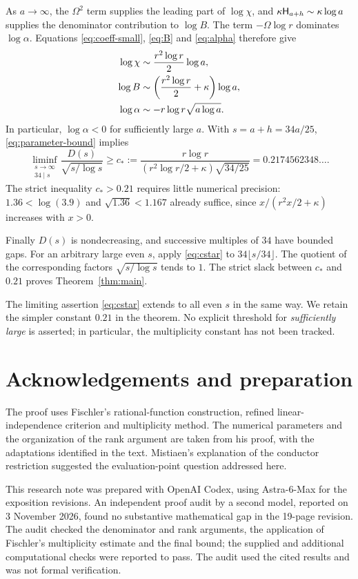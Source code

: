 As $a\to\infty$, the $\Omega^2$ term supplies the leading part of
$\log\chi$, and $\kappa\mathsf H_{a+h}\sim\kappa\log a$ supplies the
denominator contribution to $\log B$. The term $-\Omega\log r$
dominates $\log\alpha$. Equations \eqref{eq:coeff-small}, \eqref{eq:B}
and \eqref{eq:alpha} therefore give
\begin{align}
 \log\chi&\sim\frac{r^2\log r}{2}\log a,\notag\\
 \log B&\sim\left(\frac{r^2\log r}{2}+\kappa\right)\log a,
                                                   \label{eq:rates-asymptotic}\\
 \log\alpha&\sim-r\log r\sqrt{a\log a}.\notag
\end{align}
In particular, $\log\alpha<0$ for sufficiently large $a$.
With $s=a+h=34a/25$, \eqref{eq:parameter-bound} implies
\begin{equation}\label{eq:cstar}
 \liminf_{\substack{s\to\infty\\34\mid s}}
   \frac{D(s)}{\sqrt{s/\log s}}
 \geq
 c_*:=\frac{r\log r}
   {\left(r^2\log r/2+\kappa\right)\sqrt{34/25}}
 =0.2174562348\ldots .
\end{equation}
The strict inequality $c_*>0.21$ requires little numerical precision:
$1.36<\log(3.9)$ and $\sqrt{1.36}<1.167$ already suffice,
since $x/(r^2x/2+\kappa)$ increases with $x>0$.

Finally $D(s)$ is nondecreasing, and successive multiples of $34$ have
bounded gaps. For an arbitrary large even $s$, apply
\eqref{eq:cstar} to $34\lfloor s/34\rfloor$.
The quotient of the corresponding factors $\sqrt{s/\log s}$ tends to $1$.
The strict slack between $c_*$ and $0.21$ proves
Theorem~\ref{thm:main}.

\begin{remark}
The limiting assertion \eqref{eq:cstar} extends to all even $s$ in the
same way. We retain the simpler constant $0.21$ in the theorem.
No explicit threshold for \emph{sufficiently large} is asserted;
in particular, the multiplicity constant has not been tracked.
\end{remark}

\section*{Acknowledgements and preparation}

The proof uses Fischler's rational-function construction, refined
linear-independence criterion and multiplicity method. The numerical
parameters and the organization of the rank argument are taken from his
proof, with the adaptations identified in the text.
Mistiaen's explanation of the conductor restriction suggested the
evaluation-point question addressed here.

This research note was prepared with OpenAI Codex, using Astra-6-Max for
the exposition revisions. An independent proof audit by a second model,
reported on 3 November 2026, found no substantive mathematical gap in the
19-page revision. The audit checked the denominator and rank arguments,
the application of Fischler's multiplicity estimate and the final bound;
the supplied and additional computational checks were reported to pass.
The audit used the cited results and was not formal verification.

